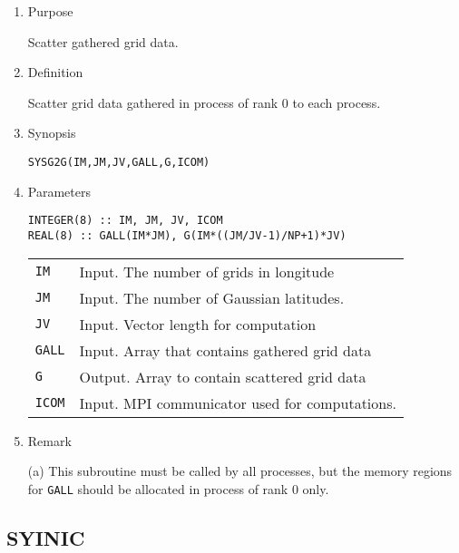 \documentclass[a4paper]{scrartcl}
\begin{document}
\begin{enumerate}

\item Purpose

Scatter gathered grid data.  

\item Definition

Scatter grid data gathered in process of rank 0 to each process.  

\item Synopsis 

\texttt{SYSG2G(IM,JM,JV,GALL,G,ICOM)}
  
\item Parameters

\begin{verbatim}        
INTEGER(8) :: IM, JM, JV, ICOM
REAL(8) :: GALL(IM*JM), G(IM*((JM/JV-1)/NP+1)*JV)
\end{verbatim}      

\begin{tabular}{ll}
\texttt{IM} & Input. The number of grids in longitude\\
\texttt{JM} & Input. The number of Gaussian latitudes.\\
\texttt{JV} & Input. Vector length for computation\\
\texttt{GALL} &  Input. Array that contains gathered grid data\\
\texttt{G} & Output. Array to contain scattered grid data\\
\texttt{ICOM} & Input. MPI communicator used for computations.
\end{tabular}

\item Remark

(a) This subroutine must be called by all processes, but
the memory regions for \texttt{GALL}
should be allocated in process of rank 0 only.

\end{enumerate}


\subsection{SYINIC}
\end{document}
